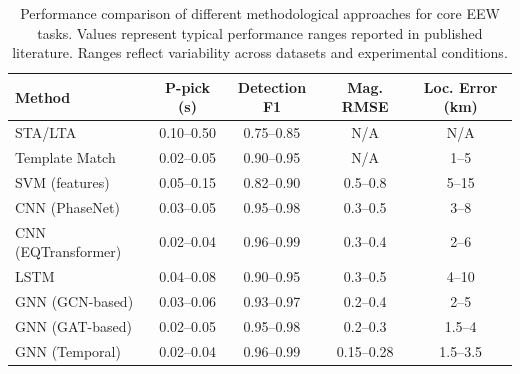 \documentclass[review,authoryear]{elsarticle}
\begin{document}
\begin{table}[htbp]
\centering
\caption{Performance comparison of different methodological approaches for core EEW tasks. Values represent typical performance ranges reported in published literature. Ranges reflect variability across datasets and experimental conditions.}
\label{tab:performance_comparison}
\small
\begin{tabular}{p{2.8cm}cccc}
\toprule
\textbf{Method} & \textbf{P-pick (s)} & \textbf{Detection F1} & \textbf{Mag. RMSE} & \textbf{Loc. Error (km)} \\
\midrule
STA/LTA \citep{allen1978automatic, withers1998comparison} & 0.10--0.50 & 0.75--0.85 & N/A & N/A \\
Template Match \citep{gibbons2006detection, yoon2015earthquake} & 0.02--0.05 & 0.90--0.95 & N/A & 1--5 \\
SVM (features) \citep{kong2019machine} & 0.05--0.15 & 0.82--0.90 & 0.5--0.8 & 5--15 \\
CNN (PhaseNet) \citep{zhu2019phasenet} & 0.03--0.05 & 0.95--0.98 & 0.3--0.5 & 3--8 \\
CNN (EQTransformer) \citep{mousavi2020earthquake} & 0.02--0.04 & 0.96--0.99 & 0.3--0.4 & 2--6 \\
LSTM \citep{ross2018generalized} & 0.04--0.08 & 0.90--0.95 & 0.3--0.5 & 4--10 \\
GNN (GCN-based) \citep{bilal2022graph, bloemheuvel2022graph} & 0.03--0.06 & 0.93--0.97 & 0.2--0.4 & 2--5 \\
GNN (GAT-based) \citep{mcbrearty2023earthquake, murshed2024scgnn} & 0.02--0.05 & 0.95--0.98 & 0.2--0.3 & 1.5--4 \\
GNN (Temporal) \citep{munchmeyer2022team, zhang2021spatiotemporal} & 0.02--0.04 & 0.96--0.99 & 0.15--0.28 & 1.5--3.5 \\
\bottomrule
\end{tabular}
\end{table}
\end{document}
